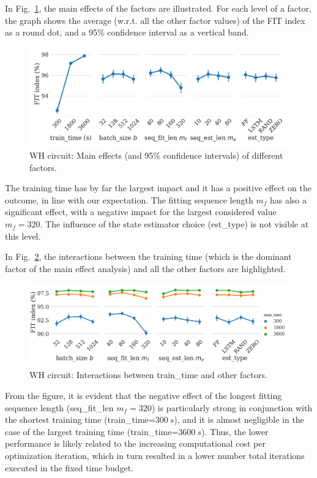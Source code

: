 \documentclass{article}
\newcommand{\seqlen}{m}
\begin{document}
In Fig.~\ref{fig:main_effects_wh}, the main effects of the factors are illustrated. For each level of a factor, the graph shows the average (w.r.t. all the other factor values) of the FIT index as a round dot, and a 95\% confidence interval as a vertical band.

\begin{figure}
    \centering
    \includegraphics[width=.7\columnwidth]{figures/wh_main_effects.pdf}
    \caption{WH circuit: Main effects (and 95\% confidence intervals) of different factors.}
    \label{fig:main_effects_wh}
\end{figure}
The training time has by far the largest impact and it has a positive effect on the outcome, in line with our expectation. The fitting sequence length $\seqlen_f$ has also a significant effect, with a negative impact for the largest considered value $\seqlen_f=320$.
The influence of the state estimator choice (est\_type) is not visible at this level.

In Fig.~\ref{fig:train_time_interactions_wh}, the interactions between the training time (which is the dominant factor of the main effect analysis) and all the other factors are highlighted.
\begin{figure}
    \centering
    \includegraphics[width=.7\columnwidth]{figures/wh_train_time_interactions.pdf}
    \caption{WH circuit: Interactions between train\_time and other factors.}
    \label{fig:train_time_interactions_wh}
\end{figure}
From the figure, it is evident that the negative effect of the longest fitting sequence length (seq\_fit\_len $\seqlen_f=320$) is particularly strong in conjunction with  the shortest training time (train\_time=$300~s$), and it is almost negligible in the case of the largest training time (train\_time=$3600~s$). Thus, the lower performance is likely related to the increasing computational cost per optimization iteration, which in turn resulted in a lower number total iterations executed in the fixed time budget.
\end{document}
